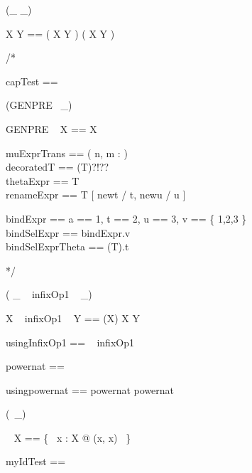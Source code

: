 \begin{zed}
 \rightassoc (\_ \inj \_)
\end{zed}

\begin{zed}
X \inj Y == ( X \pinj Y ) \cap ( X \fun Y )
\end{zed}
/*
\begin{zed}
  capTest == \nat \cap \nat
\end{zed}

\begin{zed}
  \generic (GENPRE~ \_)
\end{zed}

\begin{zed}
  GENPRE ~ X == \power X
\end{zed}

\begin{zed}
  muExprTrans == ( \mu n, m : \nat)\\
  decoratedT == (T)?!??\\
  thetaExpr == \theta T\\
  renameExpr == T [ newt / t, newu / u ]
\end{zed}

\begin{zed}
  bindExpr == \lblot a == 1, t == 2, u == 3, v == \{ 1,2,3 \} \rblot\\
  bindSelExpr == bindExpr.v\\
  bindSelExprTheta == (\theta T).t
\end{zed}
*/

\begin{zed}
   \rightassoc ( \_ ~ infixOp1 ~ \_)
\end{zed}

\begin{zed}
  X ~ infixOp1 ~ Y == (\power X) \cross X \cross Y
\end{zed}

\begin{zed}
  usingInfixOp1 == \nat ~ infixOp1 ~ \nat
\end{zed}

\begin{gendef}[X,Y]
  powernat == \power \nat
\end{gendef}

\begin{zed}
  usingpowernat == powernat \cross powernat
\end{zed}

\begin{zed}
\generic (\id ~\_)
\end{zed}

\begin{zed}
\id ~ X == \{~ x : X @ (x, x) ~\}
\end{zed}

\begin{zed}
  myIdTest == \id ~ \nat\\
\end{zed}

